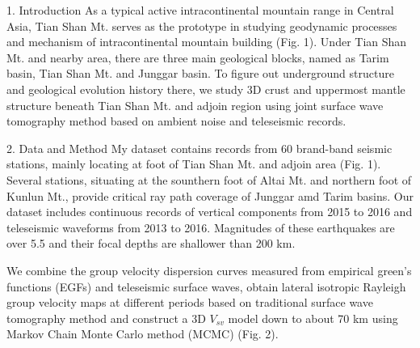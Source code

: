 \documentclass[
    landscape,      %
    paperwidth = 1200mm,
    paperheight = 900mm,
    fontscale = 0.4,
    margin = 1.7cm,
]{baposter}
\begin{document}
\begin{poster}
\begin{posterbox}[column=0, row=0]{1. Introduction}
\setlength{\parskip}{3pt}
As a typical active intracontinental mountain range in Central Asia, Tian
Shan Mt. serves as the prototype in studying geodynamic processes and mechanism
of intracontinental mountain building (Fig. 1). Under Tian Shan Mt. and nearby area,
there are three main geological blocks, named as Tarim basin, Tian Shan Mt.
and Junggar basin. To figure out underground structure and geological evolution history there,
we study 3D crust and uppermost mantle structure beneath Tian Shan Mt. and adjoin region
using joint surface wave tomography method based on ambient noise and teleseismic records.
\end{posterbox}

\begin{posterbox}[column=0, below=auto]{2. Data and Method}
\setlength{\parskip}{3pt}
My dataset contains records from 60 brand-band seismic stations, mainly
locating at foot of Tian Shan Mt. and adjoin area (Fig. 1).
Several stations, situating at the sounthern foot of Altai Mt. and northern foot of Kunlun Mt.,
provide critical ray path coverage of Junggar amd Tarim basins. Our dataset includes continuous records
of vertical components from 2015 to 2016 and teleseismic waveforms from 2013 to 2016.
Magnitudes of these earthquakes are over 5.5 and their focal depths are shallower than 200 km.

We combine the group velocity dispersion curves measured from empirical green's functions (EGFs) and teleseismic surface waves,
obtain lateral isotropic Rayleigh group velocity maps at different periods based on traditional surface wave tomography method
and  construct a 3D $V_{sv}$ model down to about 70 km using Markov Chain Monte Carlo method (MCMC) (Fig. 2).



\begin{center}


\end{center}
\end{posterbox}
\end{poster}
\end{document}
